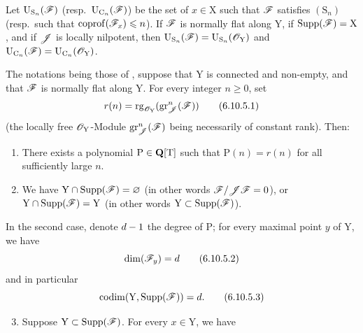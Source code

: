 \begin{corollary}[6.10.4]
\label{IV.6.10.4}
Let $\mathrm{U}_{\mathrm{S}_n}(\mathscr{F})$ \textup{(resp.}\ $\mathrm{U}_{\mathrm{C}_n}(\mathscr{F})$) be the set of $x\in\mathrm{X}$ such that $\mathscr{F}$ satisfies $(\mathrm{S}_n)$ \textup{(resp.}\ such that $\operatorname{coprof}(\mathscr{F}_x)\leqslant n$). If $\mathscr{F}$ is normally flat along $\mathrm{Y}$, if $\operatorname{Supp}(\mathscr{F})=\mathrm{X}$, and if $\mathscr{J}$ is locally nilpotent, then $\mathrm{U}_{\mathrm{S}_n}(\mathscr{F})=\mathrm{U}_{\mathrm{S}_n}(\mathscr{O}_\mathrm{Y})$ and $\mathrm{U}_{\mathrm{C}_n}(\mathscr{F})=\mathrm{U}_{\mathrm{C}_n}(\mathscr{O}_\mathrm{Y})$.
\end{corollary}

\begin{proposition}[6.10.5]
\label{IV.6.10.5}
The notations being those of , suppose that $\mathrm{Y}$ is connected and non-empty, and that $\mathscr{F}$ is normally flat along $\mathrm{Y}$. For every integer $n\geqslant 0$, set
\begin{equation}
  r(n) = \operatorname{rg}_{\mathscr{O}_\mathrm{Y}}(\operatorname{gr}^n_{\mathscr{J}}(\mathscr{F})) \tag{6.10.5.1}\label{IV.6.10.5.1}
\end{equation}
(the locally free $\mathscr{O}_\mathrm{Y}$-Module $\operatorname{gr}^n_{\mathscr{J}}(\mathscr{F})$ being necessarily of constant rank). Then:
\begin{enumerate}[label=\textup{(\roman*)}]
  \item There exists a polynomial $\mathrm{P}\in\mathbf{Q}[\mathrm{T}]$ such that $\mathrm{P}(n)=r(n)$ for all sufficiently large $n$.
  \item We have $\mathrm{Y}\cap\operatorname{Supp}(\mathscr{F})=\varnothing$ (in other words $\mathscr{F}/\mathscr{J}\mathscr{F}=0$), or $\mathrm{Y}\cap\operatorname{Supp}(\mathscr{F})=\mathrm{Y}$ (in other words $\mathrm{Y}\subset\operatorname{Supp}(\mathscr{F})$).
\end{enumerate}
In the second case, denote $d- 1$ the degree of $\mathrm{P}$; for every maximal point $y$ of $\mathrm{Y}$, we have
\begin{equation}
  \dim(\mathscr{F}_y) = d \tag{6.10.5.2}\label{IV.6.10.5.2}
\end{equation}
and in particular
\begin{equation}
  \operatorname{codim}(\mathrm{Y},\operatorname{Supp}(\mathscr{F})) = d. \tag{6.10.5.3}\label{IV.6.10.5.3}
\end{equation}
\begin{enumerate}[label=\textup{(\roman*)}]
\setcounter{enumi}{2}
  \item Suppose $\mathrm{Y}\subset\operatorname{Supp}(\mathscr{F})$. For every $x\in\mathrm{Y}$, we have

\end{enumerate}
\end{proposition}
